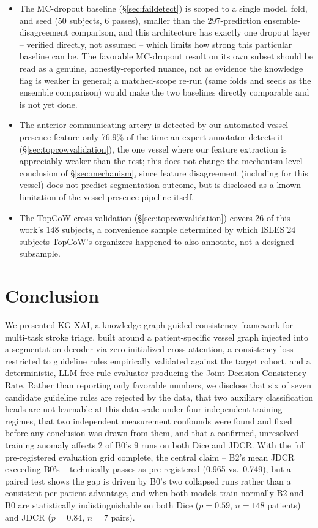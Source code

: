 \documentclass[conference]{IEEEtran}
\begin{document}
\begin{itemize}
\item The MC-dropout baseline (\S\ref{sec:faildetect}) is scoped to a single model, fold, and seed (50 subjects, 6 passes), smaller than the 297-prediction ensemble-disagreement comparison, and this architecture has exactly one dropout layer -- verified directly, not assumed -- which limits how strong this particular baseline can be. The favorable MC-dropout result on its own subset should be read as a genuine, honestly-reported nuance, not as evidence the knowledge flag is weaker in general; a matched-scope re-run (same folds and seeds as the ensemble comparison) would make the two baselines directly comparable and is not yet done.
\item The anterior communicating artery is detected by our automated vessel-presence feature only 76.9\% of the time an expert annotator detects it (\S\ref{sec:topcowvalidation}), the one vessel where our feature extraction is appreciably weaker than the rest; this does not change the mechanism-level conclusion of \S\ref{sec:mechanism}, since feature disagreement (including for this vessel) does not predict segmentation outcome, but is disclosed as a known limitation of the vessel-presence pipeline itself.
\item The TopCoW cross-validation (\S\ref{sec:topcowvalidation}) covers 26 of this work's 148 subjects, a convenience sample determined by which ISLES'24 subjects TopCoW's organizers happened to also annotate, not a designed subsample.
\end{itemize}

\section{Conclusion}
We presented KG-XAI, a knowledge-graph-guided consistency framework for multi-task stroke triage, built around a patient-specific vessel graph injected into a segmentation decoder via zero-initialized cross-attention, a consistency loss restricted to guideline rules empirically validated against the target cohort, and a deterministic, LLM-free rule evaluator producing the Joint-Decision Consistency Rate. Rather than reporting only favorable numbers, we disclose that six of seven candidate guideline rules are rejected by the data, that two auxiliary classification heads are not learnable at this data scale under four independent training regimes, that two independent measurement confounds were found and fixed before any conclusion was drawn from them, and that a confirmed, unresolved training anomaly affects 2 of B0's 9 runs on both Dice and JDCR. With the full pre-registered evaluation grid complete, the central claim -- B2's mean JDCR exceeding B0's -- technically passes as pre-registered (0.965 vs.\ 0.749), but a paired test shows the gap is driven by B0's two collapsed runs rather than a consistent per-patient advantage, and when both models train normally B2 and B0 are statistically indistinguishable on both Dice ($p=0.59$, $n=148$ patients) and JDCR ($p=0.84$, $n=7$ pairs).
\end{document}
